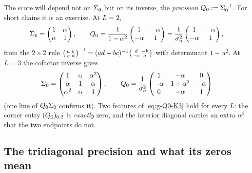 The score will depend not on $\Sigma_0$ but on its inverse, the \emph{precision}
$Q_0 := \Sigma_0^{-1}$. For short chains it is an exercise. At $L = 2$,
\begin{equation}
  \Sigma_0 = \begin{pmatrix} 1 & \alpha \\ \alpha & 1 \end{pmatrix},
  \qquad
  Q_0
  = \frac{1}{1-\alpha^2}\begin{pmatrix} 1 & -\alpha \\ -\alpha & 1 \end{pmatrix}
  = \frac{1}{\sigma_\eta^2}\begin{pmatrix} 1 & -\alpha \\ -\alpha & 1 \end{pmatrix},
  \label{eq:g-Q0-K2}
\end{equation}
from the $2\times2$ rule
$\begin{psmallmatrix}a&b\\c&d\end{psmallmatrix}^{-1}
 = (ad-bc)^{-1}\begin{psmallmatrix}d&-b\\-c&a\end{psmallmatrix}$
with determinant $1-\alpha^2$. At $L = 3$ the cofactor inverse gives
\begin{equation}
  \Sigma_0 = \begin{pmatrix}
    1 & \alpha & \alpha^2 \\
    \alpha & 1 & \alpha \\
    \alpha^2 & \alpha & 1
  \end{pmatrix},
  \qquad
  Q_0 = \frac{1}{\sigma_\eta^2}\begin{pmatrix}
    1 & -\alpha & 0 \\
    -\alpha & 1+\alpha^2 & -\alpha \\
    0 & -\alpha & 1
  \end{pmatrix}
  \label{eq:g-Q0-K3}
\end{equation}
(one line of $Q_0\Sigma_0$ confirms it). Two features of \eqref{eq:g-Q0-K3} hold
for every $L$: the corner entry $(Q_0)_{0,2}$ is \emph{exactly} zero, and the
interior diagonal carries an extra $\alpha^2$ that the two endpoints do not.

\subsection{The tridiagonal precision and what its zeros mean}

